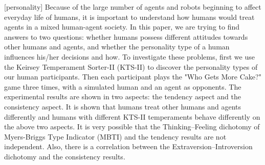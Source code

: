 [personality]
Because of the large number of agents and robots beginning to affect everyday life of humans, it is important to understand how humans would treat agents in a mixed human-agent society. In this paper, we are trying to find answers to two questions: whether humans possess different attitudes towards other humans and agents, and whether the personality type of a human influences his/her decisions and how. To investigate these problems, first we use the Keirsey Temperament Sorter-II (KTS-II) to discover the personality types of our human participants. Then each participant plays the "Who Gets More Cake?" game three times, with a simulated human and an agent as opponents. The experimental results are shown in two aspects: the tendency aspect and the consistency aspect. It is shown that humans treat other humans and agents differently and humans with different KTS-II temperaments behave differently on the above two aspects. It is very possible that the Thinking--Feeling dichotomy of Myers-Briggs Type Indicator (MBTI) and the tendency results are not independent. Also, there is a correlation between the Extraversion--Introversion dichotomy and the consistency results.